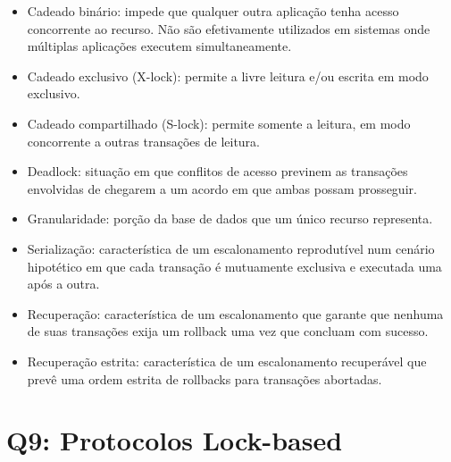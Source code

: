 \documentclass{beamer}
\begin{document}

\begin{frame}
    \begin{itemize}
        \item Cadeado binário: impede que qualquer outra aplicação tenha acesso concorrente ao recurso. Não são efetivamente utilizados em sistemas onde múltiplas aplicações executem simultaneamente.
        \item Cadeado exclusivo (X-lock): permite a livre leitura e/ou escrita em modo exclusivo.
        \item Cadeado compartilhado (S-lock): permite somente a leitura, em modo concorrente a outras transações de leitura.
        \item Deadlock: situação em que conflitos de acesso previnem as transações envolvidas de chegarem a um acordo em que ambas possam prosseguir.
    \end{itemize}
\end{frame}


\begin{frame}
    \begin{itemize}
        \item Granularidade: porção da base de dados que um único recurso representa.
        \item Serialização: característica de um escalonamento reprodutível num cenário hipotético em que cada transação é mutuamente exclusiva e executada uma após a outra.
        \item Recuperação: característica de um escalonamento que garante que nenhuma de suas transações exija um rollback uma vez que concluam com sucesso.
        \item Recuperação estrita: característica de um escalonamento recuperável que prevê uma ordem estrita de rollbacks para transações abortadas.
    \end{itemize}
\end{frame}

\section{Q9: Protocolos Lock-based}
\end{document}
